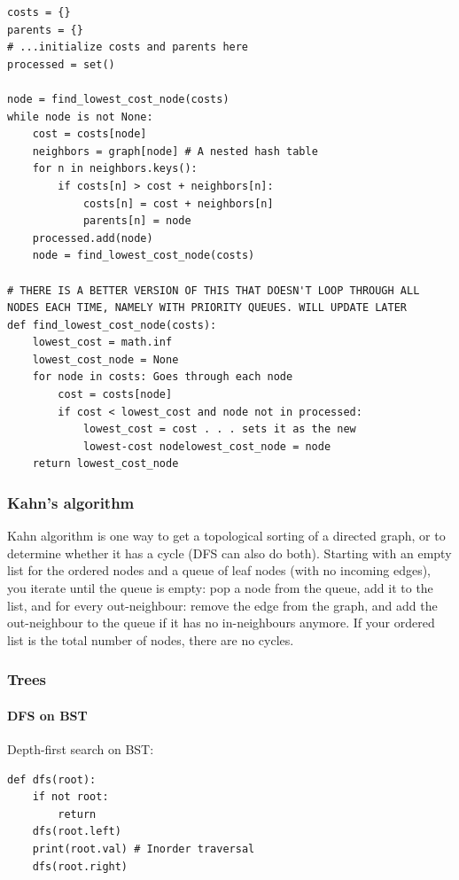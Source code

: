 \documentclass[table, xcdraw]{article}%
\begin{document}
\begin{verbatim}
costs = {}
parents = {}
# ...initialize costs and parents here
processed = set()

node = find_lowest_cost_node(costs)
while node is not None:
    cost = costs[node]
    neighbors = graph[node] # A nested hash table
    for n in neighbors.keys():
        if costs[n] > cost + neighbors[n]:
            costs[n] = cost + neighbors[n]
            parents[n] = node
    processed.add(node)
    node = find_lowest_cost_node(costs)

# THERE IS A BETTER VERSION OF THIS THAT DOESN'T LOOP THROUGH ALL NODES EACH TIME, NAMELY WITH PRIORITY QUEUES. WILL UPDATE LATER
def find_lowest_cost_node(costs):
    lowest_cost = math.inf
    lowest_cost_node = None
    for node in costs: Goes through each node
        cost = costs[node]
        if cost < lowest_cost and node not in processed:
            lowest_cost = cost . . . sets it as the new
            lowest-cost nodelowest_cost_node = node
    return lowest_cost_node
\end{verbatim}

\subsubsection{Kahn's algorithm} \label{kahns_algorithm}

Kahn algorithm is one way to get a topological sorting of a directed graph, or to determine whether it has a cycle (DFS can also do both). Starting with an empty list for the ordered nodes and a queue of leaf nodes (with no incoming edges), you iterate until the queue is empty: pop a node from the queue, add it to the list, and for every out-neighbour: remove the edge from the graph, and add the out-neighbour to the queue if it has no in-neighbours anymore. If your ordered list is the total number of nodes, there are no cycles.

\subsubsection{Trees}

\paragraph{DFS on BST}

Depth-first search on BST:

\begin{verbatim}
def dfs(root):
    if not root:
        return    
    dfs(root.left)
    print(root.val) # Inorder traversal
    dfs(root.right)
\end{verbatim}
\end{document}
